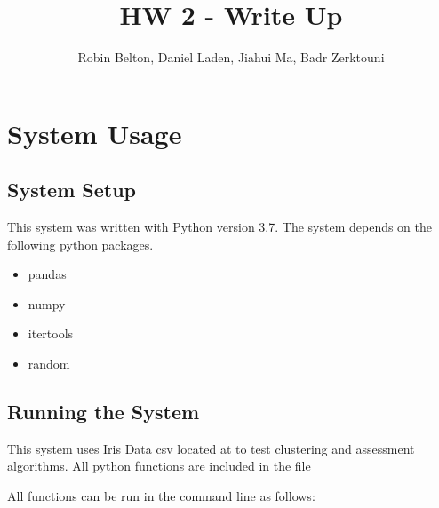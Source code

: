 \documentclass[psamsfonts,onesided,10pt]{amsart}
\title{HW 2 - Write Up}
\author{Robin Belton, Daniel Laden, Jiahui Ma,  Badr Zerktouni}
\begin{document}
\maketitle

\section{System Usage}
\subsection{System Setup}
This system was written with Python version 3.7. The system depends on the following python packages.

\begin{itemize}
    \item pandas
    \item numpy
    \item itertools 
    \item random
\end{itemize}

\subsection{Running the System}
This system uses Iris Data csv located at  
to test clustering and assessment algorithms. All python functions are included in the  file 

All functions can be run in the command line as follows:
\end{document}
